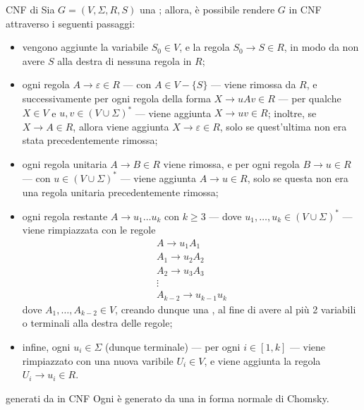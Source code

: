 \documentclass[a4paper, 12pt]{report}
\begin{document}
    \begin{framedmeth}[label={cfg into cnf}, breakable]{CNF di \CFG}
        Sia $G = (V, \Sigma, R, S)$ una \CFG; allora, è possibile rendere $G$ in CNF attraverso i seguenti passaggi:

        \begin{itemize}
            \item vengono aggiunte la variabile $S_0 \in V$, e la regola $S_0 \to S \in R$, in modo da non avere $S$ alla destra di nessuna regola in $R$;
            \item ogni regola $A \to \varepsilon \in R$ --- con $A \in V - \{S\}$ --- viene rimossa da $R$, e successivamente per ogni regola della forma $X \to uAv \in R$ --- per qualche $X \in V$ e $u, v \in (V \cup \Sigma)^*$ --- viene aggiunta $X \to uv \in R$; inoltre, se $X \to A \in R$, allora viene aggiunta $X \to \varepsilon \in R$, solo se quest'ultima non era stata precedentemente rimossa;
            \item ogni regola unitaria $A \to B \in R$ viene rimossa, e per ogni regola $B \to u \in R$ --- con $u \in (V \cup \Sigma)^*$ --- viene aggiunta $A \to u \in R$, solo se questa non era una regola unitaria precedentemente rimossa;
            \item ogni regola restante $A \to u_1 \ldots u_k$ con $k \ge 3$ --- dove $u_1, \ldots, u_k \in (V \cup \Sigma)^*$ --- viene rimpiazzata con le regole $$\left . \begin{array}{c} A \to u_1 A_1  \\ A_1 \to u_2 A_2 \\ A_2 \to u_3 A_3 \\ \vdots \\ A_{k - 2} \to u_{k - 1}u_k \end{array} \right .$$ dove $A_1, \ldots, A_{k - 2} \in V$, creando dunque una , al fine di avere al più 2 variabili o terminali alla destra delle regole;
            \item infine, ogni $u_i \in \Sigma$ (dunque terminale) --- per ogni $i \in [1, k]$ --- viene rimpiazzato con una nuova varibile $U_i \in V$, e viene aggiunta la regola $U_i \to u_i \in R$.
        \end{itemize}
    \end{framedmeth}

    \begin{framedlem}{\CFL generati da \CFG in CNF}
        Ogni \CFL è generato da una \CFG in forma normale di Chomsky.
    \end{framedlem}
\end{document}
